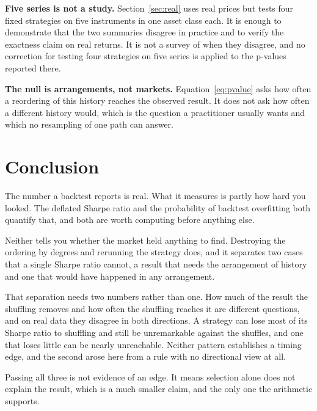 \documentclass[11pt]{article}
\begin{document}
\textbf{Five series is not a study.} Section~\ref{sec:real} uses real prices but tests four fixed strategies on five instruments in one asset class each. It is enough to demonstrate that the two summaries disagree in practice and to verify the exactness claim on real returns. It is not a survey of when they disagree, and no correction for testing four strategies on five series is applied to the p-values reported there.

\textbf{The null is arrangements, not markets.} Equation~\ref{eq:pvalue} asks how often a reordering of this history reaches the observed result. It does not ask how often a different history would, which is the question a practitioner usually wants and which no resampling of one path can answer.

\section{Conclusion}\label{sec:conclusion}

The number a backtest reports is real. What it measures is partly how hard you looked. The deflated Sharpe ratio and the probability of backtest overfitting both quantify that, and both are worth computing before anything else.

Neither tells you whether the market held anything to find. Destroying the ordering by degrees and rerunning the strategy does, and it separates two cases that a single Sharpe ratio cannot, a result that needs the arrangement of history and one that would have happened in any arrangement.

That separation needs two numbers rather than one. How much of the result the shuffling removes and how often the shuffling reaches it are different questions, and on real data they disagree in both directions. A strategy can lose most of its Sharpe ratio to shuffling and still be unremarkable against the shuffles, and one that loses little can be nearly unreachable. Neither pattern establishes a timing edge, and the second arose here from a rule with no directional view at all.

Passing all three is not evidence of an edge. It means selection alone does not explain the result, which is a much smaller claim, and the only one the arithmetic supports.



\end{document}
